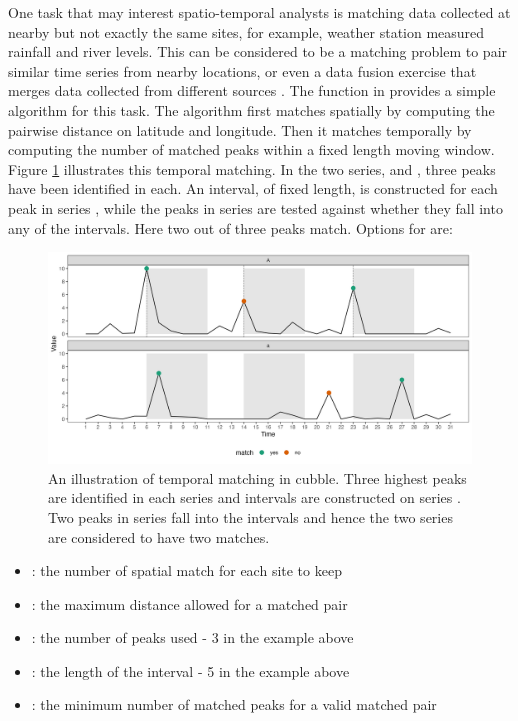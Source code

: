 \documentclass[
]{jss}
\providecommand{\tightlist}{%
  \setlength{\itemsep}{0pt}\setlength{\parskip}{0pt}}
\begin{document}
One task that may interest spatio-temporal analysts is matching data collected at nearby but not exactly the same sites, for example, weather station measured rainfall and river levels. This can be considered to be a matching problem \citep{stuart2010matching, mcintosh2018using} to pair similar time series from nearby locations, or even a data fusion exercise that merges data collected from different sources \citep{cocchi2019data}. The function  in  provides a simple algorithm for this task. The algorithm first matches spatially by computing the pairwise distance on latitude and longitude. Then it matches temporally by computing the number of matched peaks within a fixed length moving window. Figure \ref{fig:illu-matching} illustrates this temporal matching. In the two series,  and , three peaks have been identified in each. An interval, of fixed length, is constructed for each peak in series , while the peaks in series  are tested against whether they fall into any of the intervals. Here two out of three peaks match. Options for  are:

\begin{CodeChunk}
\begin{figure}

{\centering \includegraphics[width=1\linewidth]{../figures/illu-matching} 

}

\caption{An illustration of temporal matching in cubble. Three highest peaks are identified in each series and intervals are constructed on series . Two peaks in series  fall into the intervals and hence the two series are considered to have two matches.}\label{fig:illu-matching}
\end{figure}
\end{CodeChunk}

\begin{itemize}
\tightlist
\item
  : the number of spatial match for each site to keep
\item
  : the maximum distance allowed for a matched pair
\item
  : the number of peaks used - 3 in the example above
\item
  : the length of the interval - 5 in the example above
\item
  : the minimum number of matched peaks for a valid matched pair
\end{itemize}
\end{document}
